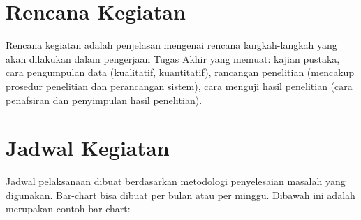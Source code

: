 \section{Rencana Kegiatan}
Rencana kegiatan adalah penjelasan mengenai rencana langkah-langkah yang akan dilakukan dalam pengerjaan Tugas Akhir yang memuat: kajian pustaka, cara pengumpulan data (kualitatif, kuantitatif), rancangan penelitian (mencakup prosedur penelitian dan perancangan sistem), cara menguji hasil penelitian (cara penafsiran dan penyimpulan hasil penelitian).


\section{Jadwal Kegiatan}

Jadwal pelaksanaan dibuat berdasarkan metodologi penyelesaian masalah yang digunakan. Bar-chart bisa dibuat per bulan atau per minggu. Dibawah ini adalah merupakan contoh bar-chart:

